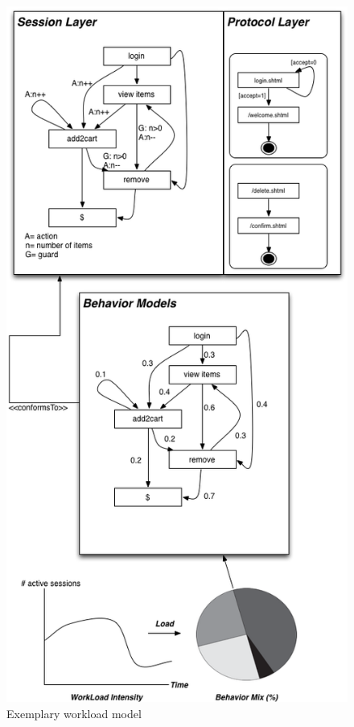 \documentclass[espaco=umemeio,chapter=TITLE,twoside,openright]{abnt}
\begin{document}
\begin{figure}[!ht]
\begin{minipage}{.5\textwidth}
\centering
\includegraphics[width=1\textwidth]{./images/vogel.png}
\caption{Exemplary workload model}
\label{fig:vogel}


\end{minipage}
\end{figure}
\end{document}
